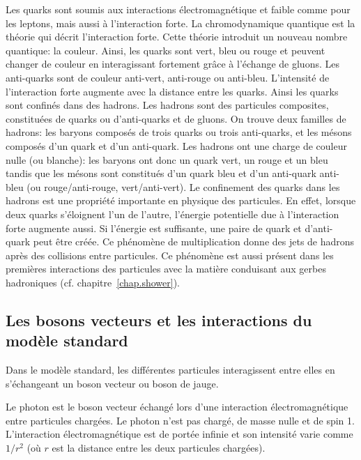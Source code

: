 Les quarks sont soumis aux interactions électromagnétique et faible comme pour les leptons, mais aussi à l'interaction forte. La chromodynamique quantique est la théorie qui décrit l'interaction forte. Cette théorie introduit un nouveau nombre quantique: la couleur. Ainsi, les quarks sont vert, bleu ou rouge et peuvent changer de couleur en interagissant fortement grâce à l'échange de gluons. Les anti-quarks sont de couleur anti-vert, anti-rouge ou anti-bleu. L'intensité de l'interaction forte augmente avec la distance entre les quarks. Ainsi les quarks sont confinés dans des hadrons. Les hadrons sont des particules composites, constituées de quarks ou d'anti-quarks et de gluons. On trouve deux familles de hadrons: les baryons composés de trois quarks ou trois anti-quarks, et les mésons composés d'un quark et d'un anti-quark. Les hadrons ont une charge de couleur nulle (ou blanche): les baryons ont donc un quark vert, un rouge et un bleu tandis que les mésons sont constitués d'un quark bleu et d'un anti-quark anti-bleu (ou rouge/anti-rouge, vert/anti-vert). Le confinement des quarks dans les hadrons est une propriété importante en physique des particules. En effet, lorsque deux quarks s'éloignent l'un de l'autre, l'énergie potentielle due à l'interaction forte augmente aussi. Si l'énergie est suffisante, une paire de quark et d'anti-quark peut être créée. Ce phénomène de multiplication donne des jets de hadrons après des collisions entre particules. Ce phénomène est aussi présent dans les premières interactions des particules avec la matière conduisant aux gerbes hadroniques (cf. chapitre~\ref{chap.shower}).

\subsection{Les bosons vecteurs et les interactions du modèle standard}
Dans le modèle standard, les différentes particules interagissent entre elles en s'échangeant un boson vecteur ou boson de jauge. 

Le photon est le boson vecteur échangé lors d'une interaction électromagnétique entre particules chargées. Le photon n'est pas chargé, de masse nulle et de spin 1. L'interaction électromagnétique est de portée infinie et son intensité varie comme $1/r^2$ (où $r$ est la distance entre les deux particules chargées).

